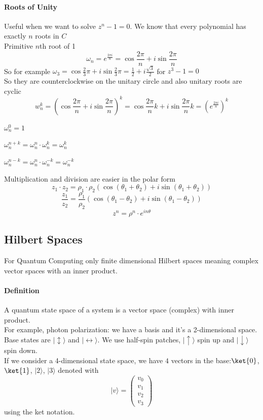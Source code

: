 \documentclass[10pt]{report}
\begin{document}
\paragraph{Roots of Unity} Useful when we want to solve $z^n - 1 = 0$. We know that every polynomial has exactly $n$ roots in $C$\\
Primitive $n$th root of 1
$$\omega_n = e^{\frac{2\pi i}{n}} = \cos \frac{2\pi}{n} + i \sin\frac{2\pi}{n}$$
So for example $\omega_3 = \cos\frac{2}{3}\pi + i\sin\frac{2}{3}\pi = \frac{1}{2}+i\frac{\sqrt{3}}{2}$ for $z^3 - 1 = 0$\\
So they are counterclockwise on the unitary circle and also unitary roots are cyclic
$$w_n^k = (\cos \frac{2\pi}{n} + i \sin\frac{2\pi}{n})^k = \cos\frac{2\pi}{n}k + i \sin\frac{2\pi}{n}k = \left(e^{\frac{2\pi i}{n}}\right)^k$$
\begin{list}{}{}
	\item $\omega_n^0 = 1$
	\item $\omega_n^{n+k} = \omega_n^n \cdot \omega_n^k = \omega_n^k$
	\item $\omega_n^{n-k} = \omega_n^n \cdot \omega_n^{-k} = \omega_n^{-k}$
\end{list}
Multiplication and division are easier in the polar form
$$z_1\cdot z_2 = \rho_1\cdot\rho_2(\cos(\theta_1+\theta_2) + i\sin(\theta_1+\theta_2))$$
$$\frac{z_1}{z_2} = \frac{\rho_1}{\rho_2}(\cos(\theta_1-\theta_2) + i\sin(\theta_1-\theta_2))$$
$$z^n = \rho^n\cdot e^{in\theta}$$
\subsection{Hilbert Spaces} For Quantum Computing only finite dimensional Hilbert spaces meaning complex vector spaces with an inner product.
\paragraph{Definition} A quantum state space of a system is a vector space (complex) with inner product.\\
For example, photon polarization: we have a basis and it's a 2-dimensional space. Base states are $|\updownarrow\rangle$ and $|\leftrightarrow\rangle$. We use half-spin patches, $|\uparrow\rangle$ spin up and $|\downarrow\rangle$ spin down.\\
If we consider a 4-dimensional state space, we have $4$ vectors in the base:$\ket{0}$, $\ket{1}$, $|2\rangle$, $|3\rangle$ denoted with $$|v\rangle=\left(\begin{array}{c}
v_0\\v_1\\v_2\\v_3
\end{array}\right)$$ using the ket notation.
\end{document}
